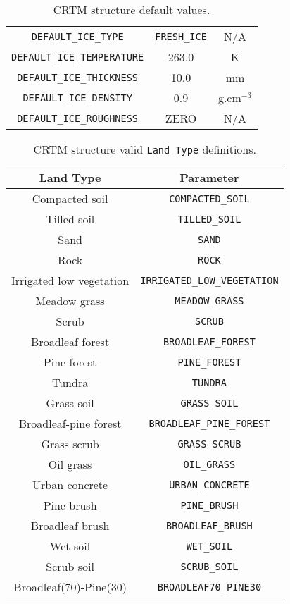 \begin{table}
\begin{tabular}{|c|c|c|}
    \hline
    \texttt{DEFAULT\_ICE\_TYPE}               & \texttt{FRESH\_ICE} & N/A\\
    \texttt{DEFAULT\_ICE\_TEMPERATURE}        & 263.0      & K\\
    \texttt{DEFAULT\_ICE\_THICKNESS}          & 10.0       & mm\\
    \texttt{DEFAULT\_ICE\_DENSITY}            & 0.9        & g.cm$^{-3}$\\
    \texttt{DEFAULT\_ICE\_ROUGHNESS}          & ZERO       & N/A\\
    \hline
  \end{tabular}
  \caption{CRTM \Surface{} structure default values.}
  \label{tab:surface_default}
\end{table}

\begin{table}
  \centering
  \begin{tabular}{|c|c|}
    \hline
    \sffamily\textbf{Land Type} & \sffamily\textbf{Parameter} \\
    \hline\hline
          Compacted soil      & \texttt{COMPACTED\_SOIL} \\
            Tilled soil       & \texttt{TILLED\_SOIL} \\
              Sand            & \texttt{SAND} \\
              Rock            & \texttt{ROCK} \\
     Irrigated low vegetation & \texttt{IRRIGATED\_LOW\_VEGETATION} \\
           Meadow grass       & \texttt{MEADOW\_GRASS} \\
              Scrub           & \texttt{SCRUB} \\
         Broadleaf forest     & \texttt{BROADLEAF\_FOREST} \\
           Pine forest        & \texttt{PINE\_FOREST} \\
             Tundra           & \texttt{TUNDRA} \\
           Grass soil         & \texttt{GRASS\_SOIL} \\
       Broadleaf-pine forest  & \texttt{BROADLEAF\_PINE\_FOREST} \\
           Grass scrub        & \texttt{GRASS\_SCRUB} \\
            Oil grass         & \texttt{OIL\_GRASS} \\
          Urban concrete      & \texttt{URBAN\_CONCRETE} \\
            Pine brush        & \texttt{PINE\_BRUSH} \\
          Broadleaf brush     & \texttt{BROADLEAF\_BRUSH} \\
             Wet soil         & \texttt{WET\_SOIL} \\
            Scrub soil        & \texttt{SCRUB\_SOIL} \\
      Broadleaf(70)-Pine(30)  & \texttt{BROADLEAF70\_PINE30} \\
    \hline
  \end{tabular}
  \caption{CRTM \Surface{} structure valid \texttt{Land\_Type} definitions.}
  \label{tab:surface_land_type}
\end{table}

